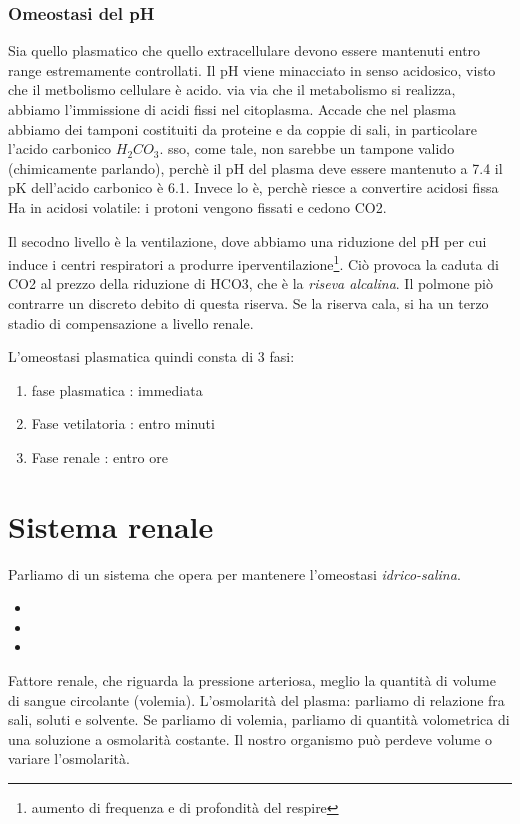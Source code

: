 \documentclass[a4paper,12pt]{article}
\begin{document}
\subsubsection{Omeostasi del pH}
Sia quello plasmatico che quello extracellulare devono essere mantenuti entro range estremamente controllati. Il pH viene minacciato in senso acidosico, visto che il metbolismo cellulare è acido. via via che il metabolismo si realizza, abbiamo l'immissione di acidi fissi nel citoplasma. Accade che nel plasma abbiamo dei tamponi costituiti da proteine e da coppie di sali, in particolare l'acido carbonico $H_{2}CO_{3}$. sso, come tale, non sarebbe un tampone valido (chimicamente parlando), perchè il pH del plasma deve essere mantenuto a 7.4  il pK dell'acido carbonico è 6.1. Invece lo è, perchè riesce a convertire acidosi fissa Ha in acidosi volatile: i protoni vengono fissati e cedono CO2. 
 
Il secodno livello è la ventilazione, dove abbiamo una riduzione del pH per cui induce i centri respiratori a produrre iperventilazione\footnote{aumento di frequenza e di profondità del respire}. Ciò provoca la caduta di CO2 al prezzo della riduzione di HCO3, che è la \emph{riseva alcalina}. Il polmone piò contrarre un discreto debito di questa riserva. Se la riserva cala, si ha un terzo stadio di compensazione a livello renale.
 
L'omeostasi plasmatica quindi consta di 3 fasi: 
 \begin{enumerate}
\item{fase plasmatica : immediata}
\item{Fase vetilatoria : entro minuti}
\item{Fase renale : entro ore} 
 \end{enumerate}
 
\section{Sistema renale}
Parliamo di un sistema che opera per mantenere l'omeostasi \emph{idrico-salina}. 
\begin{itemize}
\item{}
\item{}
\item{}
\end{itemize}

Fattore renale, che riguarda la pressione arteriosa, meglio la quantità di volume di sangue circolante (volemia). L'osmolarità del plasma: parliamo di relazione fra sali, soluti e solvente. Se parliamo di volemia, parliamo di quantità volometrica di una soluzione a osmolarità costante. Il nostro organismo può perdeve volume o variare l'osmolarità.
\end{document}
